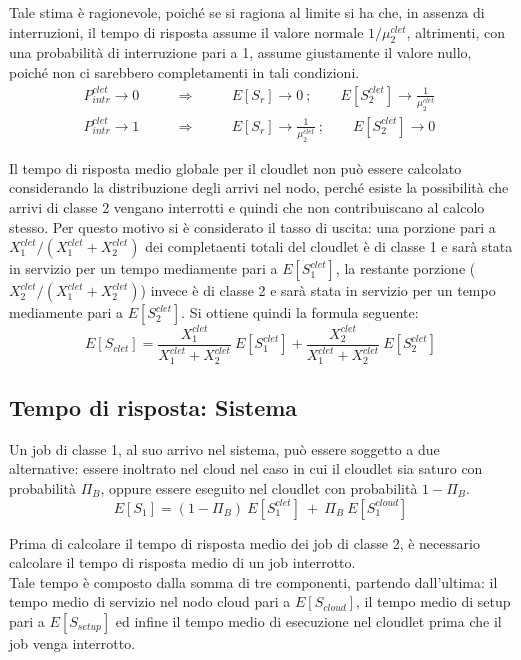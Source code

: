 Tale stima è ragionevole, poiché se si ragiona al limite si ha che, in assenza
di interruzioni, il tempo di risposta assume il valore normale $1/\mu_2^{clet}$,
altrimenti, con una probabilità di interruzione pari a 1, assume giustamente il
valore nullo, poiché non ci sarebbero completamenti in tali condizioni.
\begin{eqnarray*}
P_{intr}^{clet} \longrightarrow 0 \qquad & \Rightarrow \qquad & 
E[S_r] \rightarrow 0 \ ; \qquad E[S_2^{clet}] \rightarrow
\frac{1}{\mu_2^{clet}} \ \\
P_{intr}^{clet} \longrightarrow 1 \qquad & \Rightarrow \qquad & 
E[S_r] \rightarrow \frac{1}{\mu_2^{clet}} \ ; \qquad E[S_2^{clet}] \rightarrow 0
\end{eqnarray*}

Il tempo di risposta medio globale per il cloudlet non può essere calcolato
considerando la distribuzione degli arrivi nel nodo, perché esiste la
possibilità che arrivi di classe 2 vengano interrotti e quindi che non
contribuiscano al calcolo stesso. Per questo motivo si è considerato il tasso di
uscita: una porzione pari a $X_1^{clet}/(X_1^{clet}+X_2^{clet})$ dei
completaenti totali del cloudlet è di classe 1 e sarà stata in servizio per un
tempo mediamente pari a $E[S_1^{clet}]$, la restante porzione
($X_2^{clet}/(X_1^{clet}+X_2^{clet})$) invece è di classe 2 e sarà stata in
servizio per un tempo mediamente pari a $E[S_2^{clet}]$.  Si ottiene quindi la
formula seguente:
\begin{equation}
E[S_{clet}] = 
\frac{X_1^{clet}}{X_1^{clet}+X_2^{clet}} \ E[S_1^{clet}] +
\frac{X_2^{clet}}{X_1^{clet}+X_2^{clet}} \ E[S_2^{clet}] 
\end{equation}
%
\subsection{Tempo di risposta: Sistema}
Un job di classe 1, al suo arrivo nel sistema, può essere soggetto a due
alternative: essere inoltrato nel cloud nel caso in cui il cloudlet sia saturo
con probabilità $\Pi_B$, oppure essere eseguito nel cloudlet con probabilità
$1-\Pi_B$.
\begin{equation}
E[S_1] = (1-\Pi_B) \ E[S_1^{clet}] \ + \ \Pi_B \ E[S_1^{cloud}]
\end{equation}

Prima di calcolare il tempo di risposta medio dei job di classe 2, è necessario
calcolare il tempo di risposta medio di un job interrotto.\\
Tale tempo è composto dalla somma di tre componenti, partendo dall'ultima: il
tempo medio di servizio nel nodo cloud pari a $E[S_{cloud}]$, il tempo medio di
setup pari a $E[S_{setup}]$ ed infine il tempo medio di esecuzione nel cloudlet
prima che il job venga interrotto.

